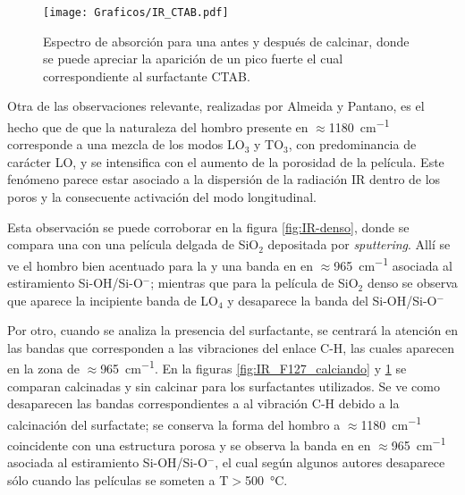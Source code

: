 				\begin{figure}[!ht]
						\begin{center}
						\texttt{[image: Graficos/IR\_CTAB.pdf]}
						\caption[FTIR para una \pdmC.]{Espectro de absorción para una \pdmC\space antes y después de calcinar, donde se puede apreciar la aparición de un pico fuerte el cual correspondiente al surfactante CTAB.}
						\label{fig:IR_CTAB_calcinado}
						\end{center}
						\end{figure}

		Otra de las observaciones relevante, realizadas por Almeida y Pantano\cite{Almeida1990}, es el hecho que de que la naturaleza del hombro presente en $\approx$\SI{1180}{\cm^{-1}}	corresponde a una mezcla de los modos LO$_3$ y TO$_3$, con predominancia de carácter LO, y se intensifica con el aumento de la porosidad de la película. Este fenómeno parece estar asociado a la dispersión de la radiación IR dentro de los poros y la consecuente activación del modo longitudinal.

		Esta observación se puede corroborar en la figura \ref{fig:IR-denso}, donde se compara una \pdm\space con una película delgada de SiO$_2$ depositada por \textit{sputtering}.  Allí se ve el hombro bien acentuado para la \pdm\space y una banda en en $\approx$\SI{965}{\cm^{-1}} asociada al estiramiento Si-OH/Si-O$^-$; mientras que para la película de SiO$_2$ denso se observa que aparece la incipiente banda de LO$_4$ y desaparece la banda del Si-OH/Si-O$^-$
				
		Por otro, cuando se analiza la presencia del surfactante, se centrará la atención en las bandas que corresponden a las vibraciones del enlace C-H, las cuales aparecen en la zona de $\approx$\SI{965}{\cm^{-1}}. En la figuras \ref{fig:IR_F127_calciando} y \ref{fig:IR_CTAB_calcinado} se comparan \pdm\space calcinadas y sin calcinar para los surfactantes utilizados. Se ve como desaparecen las bandas correspondientes a al vibración C-H debido a la calcinación del surfactate; se conserva la forma del hombro a $\approx$\SI{1180}{\cm^{-1}} coincidente con una estructura porosa y se observa la banda en en $\approx$\SI{965}{\cm^{-1}} asociada al estiramiento Si-OH/Si-O$^-$, el cual según algunos autores desaparece sólo cuando las películas se someten a T$>$\SI{500}{\celsius}.\cite{Innocenzi2003,Almeida1990,Bertoluzza1982}
	
